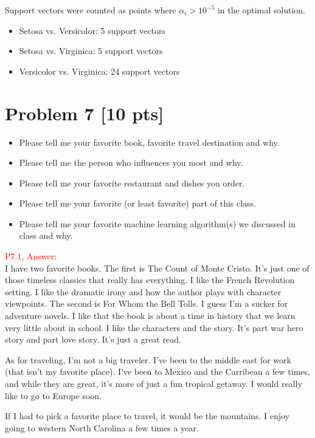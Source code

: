 \documentclass[11pt]{article}
\begin{document}
Support vectors were counted as points where $\alpha_i > 10^{-5}$ in the optimal solution.
\begin{itemize}
    \item Setosa vs. Versicolor: 5 support vectors
    \item Setosa vs. Virginica: 5 support vectors
    \item Versicolor vs. Virginica: 24 support vectors
\end{itemize}



\newpage
\section*{Problem 7 [10 pts]}
\begin{itemize}
	\item Please tell me your favorite book, favorite travel destination and why.
	\item Please tell me the person who influences you most and why.
	\item Please tell me your favorite restaurant and dishes you order.
	\item Please tell me your favorite (or least favorite) part of this class.
	\item Please tell me your favorite machine learning algorithm(s) we discussed in class and why.
\end{itemize}


\textcolor{red}{P7.1, Answer:}\\

I have two favorite books. The first is The Count of Monte Cristo. It's just one of those timeless classics that really has everything. 
I like the French Revolution setting. I like the dramatic irony and how the author plays with character viewpoints. 
The second is For Whom the Bell Tolls. I guess I'm a sucker for adventure novels. I like that the book is about a time in history 
that we learn very little about in school. I like the characters and the story. It's part war hero story and part love story. It's just a great read.

As for traveling, I'm not a big traveler. I've been to the middle east for work (that isn't my favorite place). I've been to Mexico and the Carribean a few times,
and while they are great, it's more of just a fun tropical getaway. I would really like to go to Europe soon. 

If I had to pick a favorite place to travel, it would be the mountains. I enjoy going to western North Carolina a few times a year. 
\end{document}
